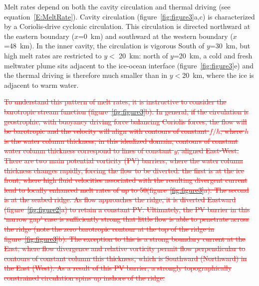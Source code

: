 \documentclass[draft]{agujournal2019}
\newcommand{\red}[1]{\textcolor{red}{#1}}
\newcommand{\rout}[1]{\red{\sout{#1}}}
\begin{document}
Melt rates depend on both the cavity circulation and thermal driving (see equation~\eqref{E:MeltRate}). Cavity circulation (figure~\ref{fig:figure3}a,c) is characterized by a Coriolis-drive cyclonic circulation. This circulation is directed northward at the eastern boundary ($x$=0~km) and southward at the western boundary ($x$=48~km). In the inner cavity, the circulation is vigorous South of $y$=30~km, but high melt rates are restricted to $y<$ 20~km: north of $y$=20~km, a cold and fresh meltwater plume sits adjacent to the ice-ocean interface (figure~\ref{fig:figure3}e) and the thermal driving is therefore much smaller than in $y<$20~km, where the ice is adjacent to warm water.


\rout{To understand this pattern of melt rates, it is instructive to consider the barotropic stream function (figure~\ref{fig:figure3}b). In general, if the circulation is geostrophic, with buoyancy driving force balancing Coriolis forces, the flow will be barotropic and the velocity will align with contours of constant $f/h$, where $h$ is the water column thickness; in this idealized domain, contours of constant water column thickness correspond to lines of constant $y$, aligned East-West. There are two main potential vorticity (PV) barriers, where the water column thickness changes rapidly, forcing the flow to be diverted: the first is at the ice front, where high fluid velocities associated with the resulting divergent current lead to locally enhanced melt rates of up to 50\mpryr (figure~\ref{fig:figure3}a). The second is at the seabed ridge. As flow approaches the ridge, it is diverted Eastward (figure~\ref{fig:figure2}a) to retain a constant PV. Ultimately, the PV barrier in this `narrow gap' case is sufficiently strong that little flow is able to penetrate across the ridge (note the zero barotropic contour at the top of the ridge in figure~\ref{fig:figure3}b). The exception to this is a strong boundary current at the East, where flow divergence and relative vorticity permit flow perpendicular to contours of constant column this thickness, which is Southward (Northward) in the East (West). As a result of this PV barrier, a strongly topographically constrained circulation spins up inshore of the ridge.} %
\end{document}
